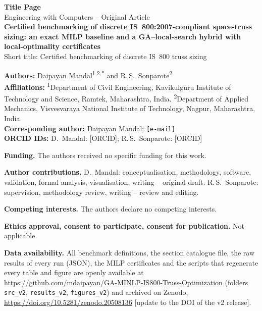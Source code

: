 \documentclass[lineno,pdflatex,sn-mathphys-num]{sn-jnl}
\begin{document}


\begin{titlepage}
\thispagestyle{empty}\small
\begin{center}
{\Large\bfseries Title Page}\\[0.7em]
{Engineering with Computers -- Original Article}\\[1.0em]
{\LARGE\bfseries Certified benchmarking of discrete IS~800:2007-compliant space-truss sizing: an exact MILP baseline and a GA--local-search hybrid with local-optimality certificates}\\[0.5em]
{\footnotesize Short title: Certified benchmarking of discrete IS~800 truss sizing}
\end{center}

\vspace{0.7em}
\noindent\textbf{Authors:} Daipayan Mandal\textsuperscript{1,2,*} and R.\,S.~Sonparote\textsuperscript{2}\\
\textbf{Affiliations:} \textsuperscript{1}Department of Civil Engineering, Kavikulguru Institute of Technology and Science, Ramtek, Maharashtra, India.
\textsuperscript{2}Department of Applied Mechanics, Visvesvaraya National Institute of Technology, Nagpur, Maharashtra, India.\\
\textbf{Corresponding author:} Daipayan Mandal; \texttt{[e-mail]}\\
\textbf{ORCID IDs:} D.~Mandal: [ORCID]; R.\,S.~Sonparote: [ORCID]

\vspace{0.7em}
\noindent\textbf{Funding.} The authors received no specific funding for this work.

\vspace{0.45em}
\noindent\textbf{Author contributions.} D.~Mandal: conceptualisation, methodology, software, validation, formal analysis, visualisation, writing -- original draft. R.\,S.~Sonparote: supervision, methodology review, writing -- review and editing.

\vspace{0.45em}
\noindent\textbf{Competing interests.} The authors declare no competing interests.

\vspace{0.45em}
\noindent\textbf{Ethics approval, consent to participate, consent for publication.} Not applicable.

\vspace{0.45em}
\noindent\textbf{Data availability.} All benchmark definitions, the section catalogue file, the raw results of every run (JSON), the MILP certificates and the scripts that regenerate every table and figure are openly available at \url{https://github.com/mdaipayan/GA-MINLP-IS800-Truss-Optimization} (folders \texttt{src\_v2}, \texttt{results\_v2}, \texttt{figures\_v2}) and archived on Zenodo, \url{https://doi.org/10.5281/zenodo.20508136} [update to the DOI of the v2 release].


\end{titlepage}
\end{document}

